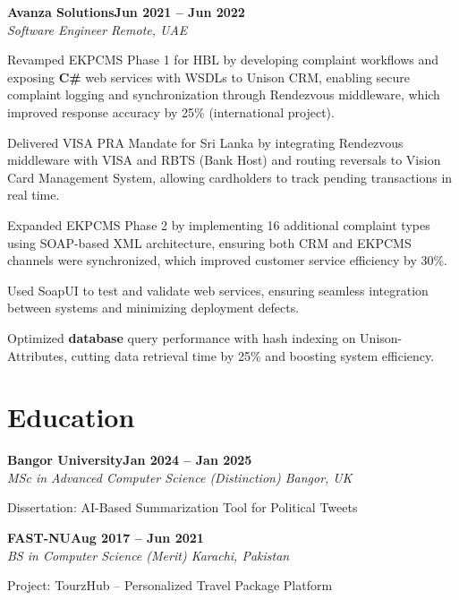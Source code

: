 \documentclass[letterpaper,10pt]{article}
\newcommand{\headingBf}[2]{
  \hspace{10pt}\textbf{#1}\hfill\textbf{#2}\\
}
\newcommand{\headingIt}[2]{
  \hspace{10pt}\textit{#1}\hfill\textit{#2}\\
}
\newenvironment{resume_list}{
  \vspace{-7pt}
  \begin{itemize}[itemsep=-2px, parsep=1pt, leftmargin=30pt]
}{
  \end{itemize}
}
\begin{document}
\headingBf{Avanza Solutions}{Jun 2021 -- Jun 2022}
\headingIt{Software Engineer \hfill Remote, UAE}{}
\begin{resume_list}
    \item Revamped EKPCMS Phase 1 for HBL by developing complaint workflows and exposing \textbf{C\#} web services with WSDLs to Unison CRM, enabling secure complaint logging and synchronization through Rendezvous middleware, which improved response accuracy by 25\% (international project).
    \item Delivered VISA PRA Mandate for Sri Lanka by integrating Rendezvous middleware with VISA and RBTS (Bank Host) and routing reversals to Vision Card Management System, allowing cardholders to track pending transactions in real time.
    \item Expanded EKPCMS Phase 2 by implementing 16 additional complaint types using SOAP-based XML architecture, ensuring both CRM and EKPCMS channels were synchronized, which improved customer service efficiency by 30\%.
    \item Used SoapUI to test and validate web services, ensuring seamless integration between systems and minimizing deployment defects.
    \item Optimized \textbf{database} query performance with hash indexing on Unison-Attributes, cutting data retrieval time by 25\% and boosting system efficiency.
\end{resume_list}

\section{Education}

\headingBf{Bangor University}{Jan 2024 -- Jan 2025}
\headingIt{MSc in Advanced Computer Science (Distinction) \hfill Bangor, UK}{}
\begin{resume_list}
    \item Dissertation: AI-Based Summarization Tool for Political Tweets
\end{resume_list}

\headingBf{FAST-NU}{Aug 2017 -- Jun 2021}
\headingIt{BS in Computer Science (Merit) \hfill Karachi, Pakistan}{}
\begin{resume_list}
    \item Project: TourzHub -- Personalized Travel Package Platform
\end{resume_list}

\end{document}
